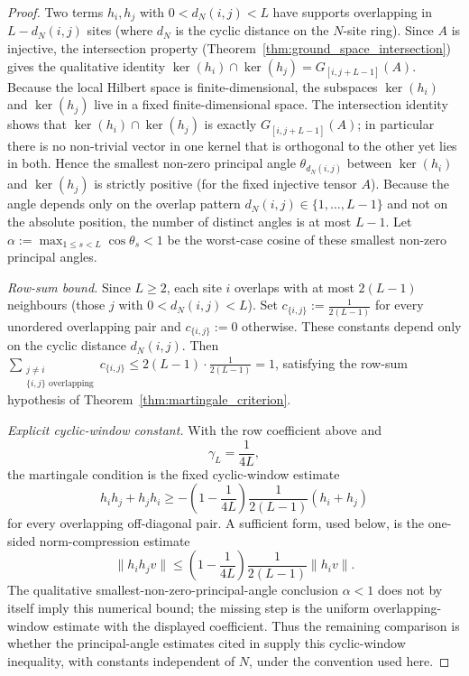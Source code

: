 \begin{proof}
    \notready
    Two terms $h_i, h_j$ with $0 < d_N(i,j) < L$ have supports overlapping
    in $L - d_N(i,j)$ sites (where $d_N$ is the cyclic distance on
    the $N$-site ring). Since $A$ is injective, the intersection property
    (Theorem~\ref{thm:ground_space_intersection}) gives the qualitative identity
    $\ker(h_i) \cap \ker(h_j) = G_{[i,j+L-1]}(A)$.
    Because the local Hilbert space is finite-dimensional, the subspaces
    $\ker(h_i)$ and $\ker(h_j)$ live in a fixed finite-dimensional space.
    The intersection identity shows that $\ker(h_i) \cap \ker(h_j)$ is
    exactly $G_{[i,j+L-1]}(A)$; in particular there is no non-trivial
    vector in one kernel that is orthogonal to the other yet lies in both.
    Hence the smallest non-zero principal angle $\theta_{d_N(i,j)}$ between
    $\ker(h_i)$ and $\ker(h_j)$ is strictly positive (for the fixed injective
    tensor $A$). Because the angle depends only on the overlap pattern
    $d_N(i,j) \in \{1,\ldots,L-1\}$ and not on the absolute position,
    the number of distinct angles is at most $L-1$.
    Let $\alpha := \max_{1 \le s < L} \cos\theta_s < 1$ be the
    worst-case cosine of these smallest non-zero principal angles.

    \emph{Row-sum bound.}
    Since $L \ge 2$, each site $i$ overlaps with at most $2(L-1)$
    neighbours (those $j$ with $0 < d_N(i,j) < L$).
    Set $c_{\{i,j\}} := \tfrac{1}{2(L-1)}$ for every unordered overlapping
    pair and $c_{\{i,j\}} := 0$ otherwise. These constants depend only on the
    cyclic distance $d_N(i,j)$.
    Then
    $\sum_{\substack{j\ne i\\ \{i,j\}\text{ overlapping}}}c_{\{i,j\}}
        \le 2(L-1)\cdot\tfrac{1}{2(L-1)} = 1$,
    satisfying the row-sum hypothesis of
    Theorem~\ref{thm:martingale_criterion}.

    \emph{Explicit cyclic-window constant.}
    With the row coefficient above and
    \[
        \gamma_L=\frac{1}{4L},
    \]
    the martingale condition is the fixed cyclic-window estimate
    \[
        h_i h_j + h_j h_i
        \ge
        -\left(1-\frac{1}{4L}\right)\frac{1}{2(L-1)}(h_i+h_j)
    \]
    for every overlapping off-diagonal pair. A sufficient form, used below, is
    the one-sided norm-compression estimate
    \[
        \|h_i h_j v\|
        \le
        \left(1-\frac{1}{4L}\right)\frac{1}{2(L-1)}\|h_i v\|.
    \]
    The qualitative smallest-non-zero-principal-angle conclusion $\alpha<1$
    does not by itself imply this numerical bound; the missing step is the
    uniform overlapping-window estimate with the displayed coefficient. Thus the
    remaining comparison is whether the principal-angle estimates cited in
    \cite{Fannes1992Finitely, Nachtergaele1996Spectral,
        Kastoryano2018Martingale} supply this cyclic-window inequality, with
    constants independent of $N$, under the convention used here.
\end{proof}

